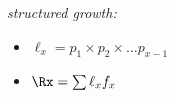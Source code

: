 \textsl{structured growth:}
\begin{itemize}
\item $\ell_x= p_1 \times p_2 \times \ldots p_{x-1}$
\item $\Rx = \sum \ell_x f_x$
\end{itemize}
